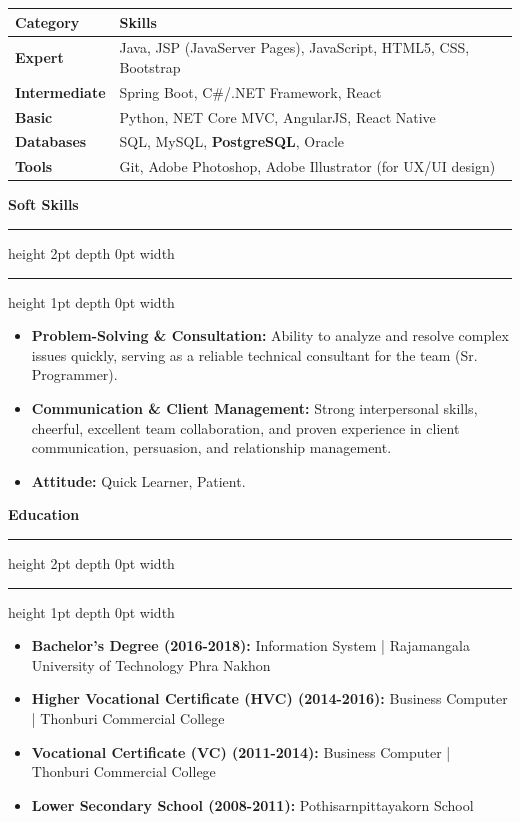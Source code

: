 \documentclass[11pt, a4paper]{article}
\newcommand{\sectiontitle}[1]{
    \vspace{1em}
    {\Large\bfseries\sffamily\color{primaryblue} #1} 
    \vspace{0.3em}
    \hrule height 2pt depth 0pt width \textwidth \color{linecolor}
    \hrule height 1pt depth 0pt width \textwidth
    \vspace{0.7em}
}
\begin{document}
\begin{tabularx}{\textwidth}{@{} l >{\raggedright\arraybackslash}X @{}}
    \toprule %
    \textbf{Category} & \textbf{Skills} \\
    \midrule %
    \textbf{Expert} & Java, JSP (JavaServer Pages), JavaScript, HTML5, CSS, Bootstrap \\[0.3em]
    \textbf{Intermediate} & Spring Boot, C\#/.NET Framework, React \\[0.3em]
    \textbf{Basic} & Python, NET Core MVC, AngularJS, React Native \\[0.3em]
    \textbf{Databases} & SQL, MySQL, \textbf{PostgreSQL}, Oracle \\[0.3em]
    \textbf{Tools} & Git, Adobe Photoshop, Adobe Illustrator (for UX/UI design) \\
    \bottomrule %
\end{tabularx}


\sectiontitle{Soft Skills}
\color{black}
\begin{itemize}
    \item \textbf{Problem-Solving \& Consultation:} Ability to analyze and resolve complex issues quickly, serving as a reliable technical consultant for the team (Sr. Programmer).
    \item \textbf{Communication \& Client Management:} Strong interpersonal skills, cheerful, excellent team collaboration, and proven experience in client communication, persuasion, and relationship management.
    \item \textbf{Attitude:} Quick Learner, Patient.
\end{itemize}

\sectiontitle{Education}
\color{black}
\begin{itemize}
    \item \textbf{Bachelor’s Degree (2016-2018):} Information System | Rajamangala University of Technology Phra Nakhon
    \item \textbf{Higher Vocational Certificate (HVC) (2014-2016):} Business Computer | Thonburi Commercial College
    \item \textbf{Vocational Certificate (VC) (2011-2014):} Business Computer | Thonburi Commercial College
    \item \textbf{Lower Secondary School (2008-2011):} Pothisarnpittayakorn School
\end{itemize}
\end{document}
